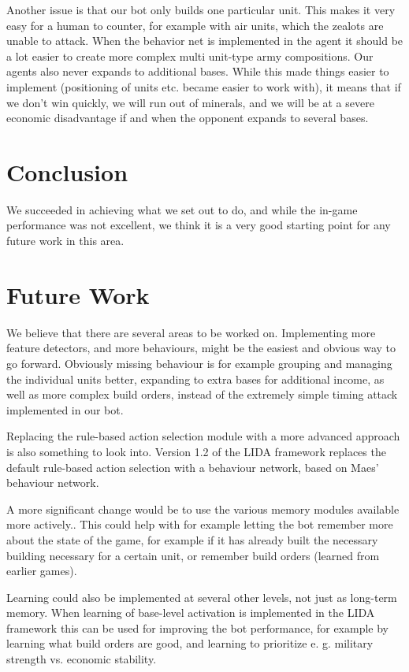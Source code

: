 Another issue is that our bot only builds one particular unit. This makes it very easy for a human to counter, for example with air units, which the zealots are unable to attack. When the behavior net is implemented in the agent it should be a lot easier to create more complex multi unit-type army compositions.
Our agents also never expands to additional bases. While this made things easier to implement (positioning of units etc. became easier to work with), it means that if we don't win quickly, we will run out of minerals, and we will be at a severe economic disadvantage if and when the opponent expands to several bases.

\section{Conclusion}
\label{sec:conclusion}
We succeeded in achieving what we set out to do, and while the in-game performance was not excellent, we think it is a very good starting point for any future work in this area.

\section{Future Work}
\label{sec:futurework}
We believe that there are several areas to be worked on. Implementing more feature detectors, and more behaviours, might be the easiest and obvious way to go forward. Obviously missing behaviour is for example grouping and managing the individual units better, expanding to extra bases for additional income, as well as more complex build orders, instead of the extremely simple timing attack implemented in our bot.

Replacing the rule-based action selection module with a more advanced approach is also something to look into. Version 1.2 of the LIDA framework replaces the default rule-based action selection with a behaviour network, based on Maes' behaviour network.\cite{maes1989right}

A more significant change would be to use the various memory modules available more actively.\cite{franklin2007lida}. This could help with for example letting the bot remember more about the state of the game, for example if it has already built the necessary building necessary for a certain unit, or remember build orders (learned from earlier games).

Learning could also be implemented at several other levels, not just as long-term memory. When learning of base-level activation is implemented in the LIDA framework this can be used for improving the bot performance, for example by learning what build orders are good, and learning to prioritize e. g. military strength vs. economic stability.
